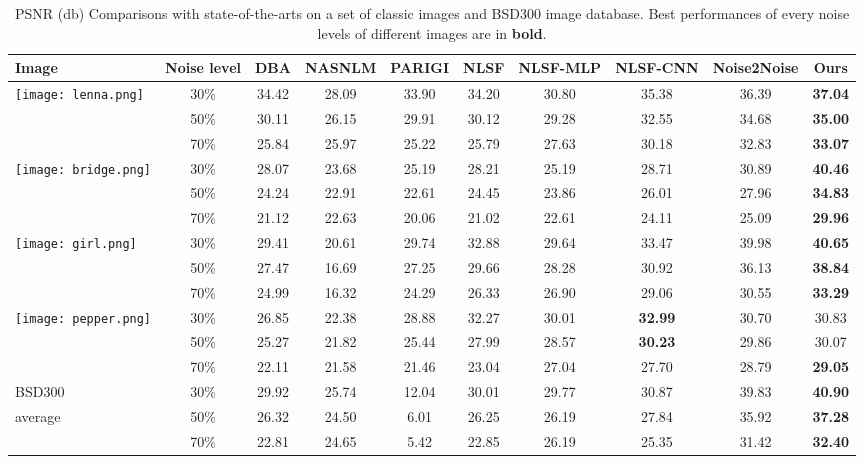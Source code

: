 \documentclass[journal]{IEEEtran}
\begin{document}
\begin{table*}
\centering
\begin{tabular}{l|ccccccccc}
\toprule
Image & Noise level &  DBA \cite{Srinivasan2007SPL}  & NASNLM \cite{Varghese2015} & PARIGI \cite{Julie2016} & NLSF \cite{Fu2018Multimedia} & NLSF-MLP \cite{Burger2012} & NLSF-CNN \cite{Fu2018Multimedia} & Noise2Noise \cite{Lehtinen2018} & Ours \\
\midrule
\multirow{3}{*}{\texttt{[image: lenna.png]}}
 & 30\% & 34.42 & 28.09 & 33.90 &34.20 & 30.80 & 35.38 & 36.39& \textbf{37.04} \\
 & 50\% & 30.11 & 26.15 & 29.91 & 30.12 & 29.28 & 32.55 & 34.68 & \textbf{35.00} \\
 & 70\% & 25.84 & 25.97 & 25.22 & 25.79 & 27.63 & 30.18 & 32.83 & \textbf{33.07} \\
\midrule
\multirow{3}{*}{\texttt{[image: bridge.png]}}
 & 30\% & 28.07 & 23.68 & 25.19 & 28.21 & 25.19 & 28.71 & 30.89 & \textbf{40.46} \\
 & 50\% & 24.24 & 22.91 & 22.61 & 24.45 & 23.86 & 26.01 & 27.96 & \textbf{34.83} \\
 & 70\% & 21.12 & 22.63 & 20.06 & 21.02 & 22.61 & 24.11 & 25.09 & \textbf{29.96} \\
\midrule
\multirow{3}{*}{\texttt{[image: girl.png]}}
 & 30\% & 29.41 & 20.61 & 29.74 & 32.88 & 29.64 & 33.47 & 39.98 & \textbf{40.65} \\
 & 50\% & 27.47 & 16.69 & 27.25 & 29.66 & 28.28 & 30.92 & 36.13 & \textbf{38.84} \\
 & 70\% & 24.99 & 16.32 & 24.29 & 26.33 & 26.90 & 29.06 & 30.55 & \textbf{33.29} \\
\midrule
\multirow{3}{*}{\texttt{[image: pepper.png]}}
 & 30\% & 26.85 & 22.38 & 28.88 & 32.27 & 30.01 & \textbf{32.99} & 30.70 & 30.83 \\
 & 50\% & 25.27 & 21.82 & 25.44 & 27.99 & 28.57 & \textbf{30.23} & 29.86 & 30.07 \\
 & 70\% & 22.11 & 21.58 & 21.46 & 23.04 & 27.04 & 27.70 & 28.79 & \textbf{29.05} \\
\midrule
BSD300 & 30\% & 29.92 & 25.74 & 12.04 & 30.01 & 29.77 & 30.87 & 39.83 & \textbf{40.90} \\
\multirow{2}{*}{average} & 50\% & 26.32 & 24.50 &  6.01 & 26.25 & 26.19 & 27.84 & 35.92 & \textbf{37.28} \\
 & 70\% & 22.81 & 24.65 & 5.42 & 22.85 & 26.19 & 25.35 & 31.42 & \textbf{32.40} \\
\bottomrule
\end{tabular}
\caption{PSNR (db) Comparisons with state-of-the-arts on a set of classic images and BSD300 image database. Best performances of every noise levels of different images are in \textbf{bold}.}
\label{tab:pnsr_classic}
\end{table*}
\end{document}
